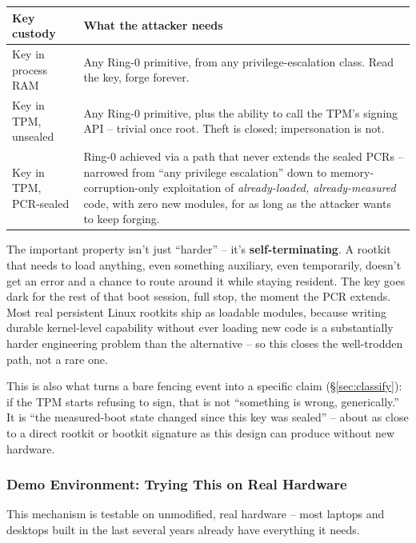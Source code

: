 \documentclass[11pt,a4paper]{article}
\begin{document}
\begin{center}
\renewcommand{\arraystretch}{1.4}
\small
\begin{tabular}{@{}p{3.6cm}p{9.8cm}@{}}
\toprule
\textbf{Key custody} & \textbf{What the attacker needs} \\
\midrule
Key in process RAM & Any Ring-0 primitive, from any privilege-escalation
class. Read the key, forge forever. \\
Key in TPM, unsealed & Any Ring-0 primitive, plus the ability to call
the TPM's signing API -- trivial once root. Theft is closed;
impersonation is not. \\
Key in TPM, PCR-sealed & Ring-0 achieved via a path that never extends
the sealed PCRs -- narrowed from ``any privilege escalation'' down to
memory-corruption-only exploitation of \emph{already-loaded,
already-measured} code, with zero new modules, for as long as the
attacker wants to keep forging. \\
\bottomrule
\end{tabular}
\end{center}

\begin{plainbox}
The important property isn't just ``harder'' -- it's
\textbf{self-terminating}. A rootkit that needs to load anything, even
something auxiliary, even temporarily, doesn't get an error and a
chance to route around it while staying resident. The key goes dark
for the rest of that boot session, full stop, the moment the PCR
extends. Most real persistent Linux rootkits ship as loadable modules,
because writing durable kernel-level capability without ever loading
new code is a substantially harder engineering problem than the
alternative -- so this closes the well-trodden path, not a rare one.
\end{plainbox}

This is also what turns a bare fencing event into a specific claim
(\S\ref{sec:classify}): if the TPM starts refusing to sign, that is
not ``something is wrong, generically.'' It is ``the measured-boot
state changed since this key was sealed'' -- about as close to a
direct rootkit or bootkit signature as this design can produce without
new hardware.

\subsubsection{Demo Environment: Trying This on Real Hardware}
\label{sec:demo-env}

This mechanism is testable on unmodified, real hardware -- most
laptops and desktops built in the last several years already have
everything it needs.
\end{document}
